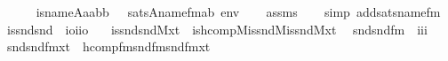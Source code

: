 \begin{isabellebody}
\ \ \isanewline
\ \ \ \ {\isachardoublequoteopen}is{\isacharunderscore}{\kern0pt}name{}{\isacharparenleft}{\kern0pt}{\isacharhash}{\kern0pt}{\isacharhash}{\kern0pt}A{\isacharcomma}{\kern0pt}aa{\isacharcomma}{\kern0pt}bb{\isacharparenright}{\kern0pt}\ \ {\isasymlongleftrightarrow}\ sats{\isacharparenleft}{\kern0pt}A{\isacharcomma}{\kern0pt}name{}{\isacharunderscore}{\kern0pt}fm{\isacharparenleft}{\kern0pt}a{\isacharcomma}{\kern0pt}b{\isacharparenright}{\kern0pt}{\isacharcomma}{\kern0pt}\ env{\isacharparenright}{\kern0pt}{\isachardoublequoteclose}\isanewline
%
\isadelimproof
\ \ %
\endisadelimproof
%
\isatagproof
{}\isamarkupfalse%
\ assms\isanewline
\ \ \isamarkupfalse%
\ {\isacharparenleft}{\kern0pt}simp\ add{\isacharcolon}{\kern0pt}sats{\isacharunderscore}{\kern0pt}name{}{\isacharunderscore}{\kern0pt}fm{\isacharparenright}{\kern0pt}%
\endisatagproof
{\isafoldproof}%
%
\isadelimproof
\isanewline
%
\endisadelimproof
\isanewline
{}\isamarkupfalse%
\isanewline
\ \ is{\isacharunderscore}{\kern0pt}snd{\isacharunderscore}{\kern0pt}snd\ {\isacharcolon}{\kern0pt}{\isacharcolon}{\kern0pt}\ {\isachardoublequoteopen}{\isacharparenleft}{\kern0pt}i{\isasymRightarrow}o{\isacharparenright}{\kern0pt}{\isasymRightarrow}i{\isasymRightarrow}i{\isasymRightarrow}o{\isachardoublequoteclose}\ \isanewline
\ \ {\isachardoublequoteopen}is{\isacharunderscore}{\kern0pt}snd{\isacharunderscore}{\kern0pt}snd{\isacharparenleft}{\kern0pt}M{\isacharcomma}{\kern0pt}x{\isacharcomma}{\kern0pt}t{\isacharparenright}{\kern0pt}\ {\isasymequiv}\ is{\isacharunderscore}{\kern0pt}hcomp{\isacharparenleft}{\kern0pt}M{\isacharcomma}{\kern0pt}is{\isacharunderscore}{\kern0pt}snd{\isacharparenleft}{\kern0pt}M{\isacharparenright}{\kern0pt}{\isacharcomma}{\kern0pt}is{\isacharunderscore}{\kern0pt}snd{\isacharparenleft}{\kern0pt}M{\isacharparenright}{\kern0pt}{\isacharcomma}{\kern0pt}x{\isacharcomma}{\kern0pt}t{\isacharparenright}{\kern0pt}{\isachardoublequoteclose}\isanewline
\isanewline
{}\isamarkupfalse%
\isanewline
\ \ snd{\isacharunderscore}{\kern0pt}snd{\isacharunderscore}{\kern0pt}fm\ {\isacharcolon}{\kern0pt}{\isacharcolon}{\kern0pt}\ {\isachardoublequoteopen}{\isacharbrackleft}{\kern0pt}i{\isacharcomma}{\kern0pt}i{\isacharbrackright}{\kern0pt}{\isasymRightarrow}i{\isachardoublequoteclose}\ \isanewline
\ \ {\isachardoublequoteopen}snd{\isacharunderscore}{\kern0pt}snd{\isacharunderscore}{\kern0pt}fm{\isacharparenleft}{\kern0pt}x{\isacharcomma}{\kern0pt}t{\isacharparenright}{\kern0pt}\ {\isasymequiv}\ hcomp{\isacharunderscore}{\kern0pt}fm{\isacharparenleft}{\kern0pt}snd{\isacharunderscore}{\kern0pt}fm{\isacharcomma}{\kern0pt}snd{\isacharunderscore}{\kern0pt}fm{\isacharcomma}{\kern0pt}x{\isacharcomma}{\kern0pt}t{\isacharparenright}{\kern0pt}{\isachardoublequoteclose}\isanewline

\end{isabellebody}
